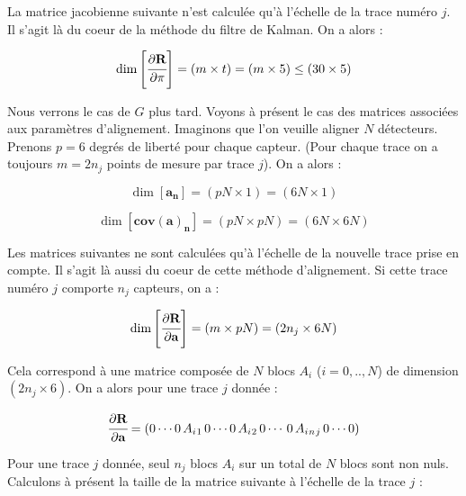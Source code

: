 \begin{appendices}
   La matrice jacobienne suivante n'est calcul\'ee qu'\`a l'\'echelle de la trace num\'ero $j$. Il s'agit l\`a du coeur de la m\'ethode du filtre de Kalman. On a alors : 
   
   \begin{equation}
    \dim\left[\cfrac{ \partial \mathbf{R} }{ \partial \mathbf{\pi} }\right] = (m \times t) = (m \times 5) \leq (30 \times 5)
   \end{equation}

   Nous verrons le cas de $G$ plus tard. Voyons \`a pr\'esent le cas des matrices associ\'ees aux param\`etres d'alignement. Imaginons que l'on veuille aligner $N$ d\'etecteurs. Prenons $p=6$ degr\'es de libert\'e pour chaque capteur. (Pour chaque trace on a toujours $m=2n_j$ points de mesure par trace $j$). On a alors :
   
   \begin{equation}
    \dim[\mathbf{a_n}] = (pN \times 1) = (6N \times 1)
   \end{equation}
   
   \begin{equation}
    \dim[\mathbf{cov(a)_{n}}] = (pN \times pN) = (6N \times 6N)
   \end{equation}
   
   Les matrices suivantes ne sont calcul\'ees qu'\`a l'\'echelle de la nouvelle trace prise en compte. Il s'agit l\`a aussi du coeur de cette m\'ethode d'alignement. Si cette trace num\'ero $j$ comporte $n_j$ capteurs, on a :
   
   \begin{equation}
    \dim\left[\cfrac{ \partial \mathbf{R} }{ \partial \mathbf{a} }\right] = (m \times pN) = (2n_j \times 6N)
   \end{equation}
   
   Cela correspond \`a une matrice compos\'ee de $N$ blocs $A_i$ ($i=0,..,N$) de dimension $(2n_j \times 6)$. On a alors pour une trace $j$ donn\'ee :
   
   \begin{equation}
    \cfrac{ \partial \mathbf{R} }{ \partial \mathbf{a} } = (0 \cdots 0 \, A_i{_1} \, 0 \cdots 0 \, A_i{_2} \, 0 \cdots \, 0 \, A_i{_n{_j}} \, 0 \cdots 0 )
   \end{equation}
   
   Pour une trace $j$ donn\'ee, seul $n_j$ blocs $A_i$ sur un total de $N$ blocs sont non nuls. Calculons \`a pr\'esent la taille de la matrice suivante \`a l'\'echelle de la trace $j$ :
   

\end{appendices}
